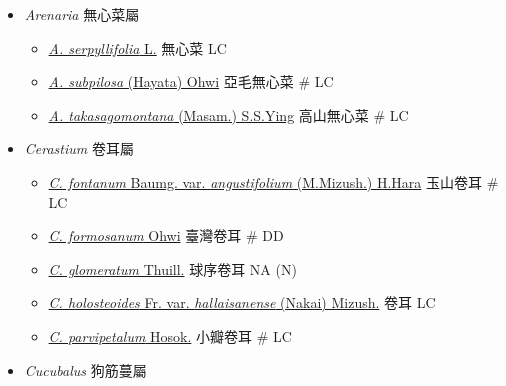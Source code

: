 
  \begin{itemize}
 \item[] \textit{Arenaria} 無心菜屬
                                
  \begin{itemize}
        \item[] \href{http://www.theplantlist.org/tpl1.1/search?q=Arenaria+serpyllifolia}{\textit{A. serpyllifolia} L.}   無心菜   LC
        \item[] \href{http://www.theplantlist.org/tpl1.1/search?q=Arenaria+subpilosa}{\textit{A. subpilosa} (Hayata) Ohwi}   亞毛無心菜  \# LC
        \item[] \href{http://www.theplantlist.org/tpl1.1/search?q=Arenaria+takasagomontana}{\textit{A. takasagomontana} (Masam.) S.S.Ying}   高山無心菜  \# LC
  \end{itemize}
 \item[] \textit{Cerastium} 卷耳屬
                                
  \begin{itemize}
        \item[] \href{http://www.theplantlist.org/tpl1.1/search?q=Cerastium+fontanum+var.+angustifolium}{\textit{C. fontanum} Baumg. var. \textit{angustifolium} (M.Mizush.) H.Hara}   玉山卷耳  \# LC
        \item[] \href{http://www.theplantlist.org/tpl1.1/search?q=Cerastium+formosanum}{\textit{C. formosanum} Ohwi}   臺灣卷耳  \# DD
        \item[] \href{http://www.theplantlist.org/tpl1.1/search?q=Cerastium+glomeratum}{\textit{C. glomeratum} Thuill.}   球序卷耳   NA (N)
        \item[] \href{http://www.theplantlist.org/tpl1.1/search?q=Cerastium+holosteoides+var.+hallaisanense}{\textit{C. holosteoides} Fr. var. \textit{hallaisanense} (Nakai) Mizush.}   卷耳   LC
        \item[] \href{http://www.theplantlist.org/tpl1.1/search?q=Cerastium+parvipetalum}{\textit{C. parvipetalum} Hosok.}   小瓣卷耳  \# LC
  \end{itemize}
 \item[] \textit{Cucubalus} 狗筋蔓屬
                                

\end{itemize}
